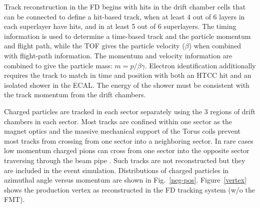 \documentclass[final,3p,times,twocolumn,authoryear]{elsarticle}
\begin{document}
Track reconstruction in the FD begins with hits in the drift chamber cells that can be connected to define a 
hit-based track, when at least 4 out of 6 layers in each superlayer have hits, and in at least   
5 out of 6 superlayers. The timing information is used to determine a time-based track and the particle 
momentum and 
flight path, while the TOF gives the particle velocity ($\beta$) when combined with flight-path information. The 
momentum and velocity information are combined to give the particle mass: $m = p/\beta\gamma$. Electron 
identification additionally requires the track to match in time and position with both an HTCC hit and an isolated 
shower in the ECAL. The energy of the shower must be consistent with the track momentum from the drift chambers.  

Charged particles are tracked in each sector separately using the 3 regions of drift chambers in each sector. 
Most tracks are confined within one sector as the magnet optics and the massive mechanical support 
of the Torus coils prevent most tracks from crossing from one sector into a neighboring sector. 
In rare cases low momentum charged pions can cross from one sector into the opposite sector traversing through the beam pipe . Such tracks are not reconstructed but they are included in the event simulation. 
Distributions of charged particles in azimuthal angle versus momentum are shown in Fig.~\ref{neg-pos}.  
Figure~\ref{vertex} shows the production vertex as reconstructed in the FD tracking system (w/o the FMT). 
\end{document}
